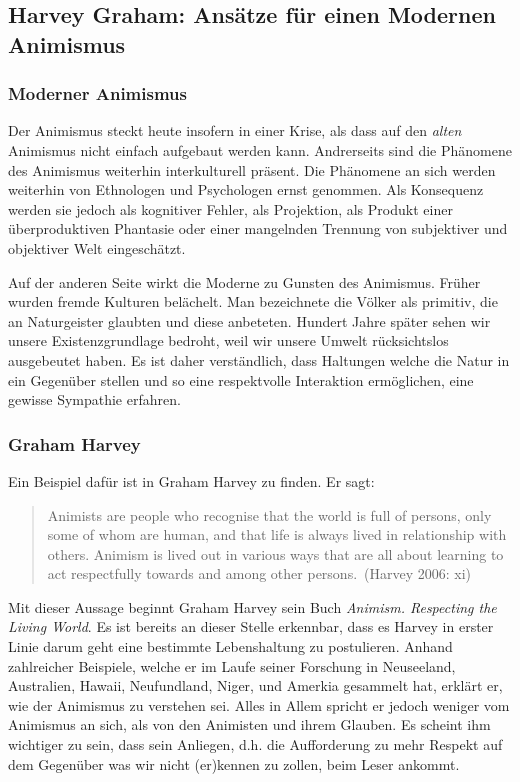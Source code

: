 \subsection{Harvey Graham: Ansätze für einen Modernen Animismus}
\subsubsection*{Moderner Animismus}
Der Animismus steckt heute insofern in einer Krise, als dass auf den \emph{alten} Animismus nicht einfach aufgebaut werden kann. Andrerseits sind die Phänomene des Animismus weiterhin interkulturell präsent. Die Phänomene an sich werden weiterhin von Ethnologen und Psychologen ernst genommen. Als Konsequenz werden sie jedoch als kognitiver Fehler, als Projektion, als Produkt einer überproduktiven Phantasie oder einer mangelnden Trennung von subjektiver und objektiver Welt eingeschätzt. 

Auf der anderen Seite wirkt die Moderne zu Gunsten des Animismus. Früher wurden fremde Kulturen belächelt. Man bezeichnete die Völker als primitiv, die an Naturgeister glaubten und diese anbeteten. Hundert Jahre später sehen wir unsere Existenzgrundlage bedroht, weil wir unsere Umwelt rücksichtslos ausgebeutet haben. Es ist daher verständlich, dass Haltungen welche die Natur in ein Gegenüber stellen und so eine respektvolle Interaktion ermöglichen, eine gewisse Sympathie erfahren. 

\subsubsection*{Graham Harvey}
Ein Beispiel dafür ist in Graham Harvey zu finden. Er sagt: 

\begin{quote}
	\glqq Animists are people who recognise that the world is full of persons, only some of whom are human, and that life is always lived in relationship with others. Animism is lived out in various ways that are all about learning to act respectfully towards and among other persons.\grqq ~(Harvey 2006: xi)
\end{quote}

Mit dieser Aussage beginnt Graham Harvey sein Buch \emph{Animism. Respecting the Living World}. Es ist bereits an dieser Stelle erkennbar, dass es Harvey in erster Linie darum geht eine bestimmte Lebenshaltung zu postulieren. Anhand zahlreicher Beispiele, welche er im Laufe seiner Forschung in Neuseeland, Australien, Hawaii, Neufundland, Niger, und Amerkia gesammelt hat, erklärt er, wie der Animismus zu verstehen sei. Alles in Allem spricht er jedoch weniger vom Animismus an sich, als von den Animisten und ihrem Glauben. Es scheint ihm wichtiger zu sein, dass sein Anliegen, d.h. die Aufforderung zu mehr Respekt auf dem Gegenüber was wir nicht (er)kennen zu zollen, beim Leser ankommt. 

